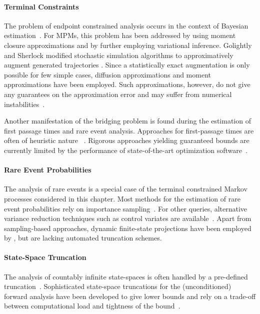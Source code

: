 \paragraph{Terminal Constraints}
The problem of endpoint constrain\-ed analysis occurs in the context
of Bayesian estimation~\parencite{sarkka2013bayesian}.
For \acp{MPM}, this problem has been addressed by
\citet{huang2016reconstructing} using moment closure approximations
and by \citet{wildner2019moment} further employing variational inference.
Golightly and Sherlock modified stochastic simulation algorithms to
approximatively
augment generated trajectories  \parencite{golightly2019efficient}.
Since a statistically exact augmentation is only possible for few
simple cases, diffusion approximations
\parencite{golightly2005bayesian} and moment approximations
\parencite{milner2013moment} have been employed.
Such approximations, however, do not give any guarantees on the
approximation error
and may suffer from numerical instabilities~\parencite{schnoerr2014validity}.

Another manifestation of the bridging problem is found during the
estimation of first passage times and rare event analysis.
Approaches for first-passage times are often of heuristic nature
~\parencite{schnoerr2017efficient,hayden2012fluid,bortolussi2014stochastic}.
Rigorous approaches yielding guaranteed bounds are currently limited
by the performance of state-of-the-art optimization
software~\parencite{backenkohler2019bounding}.

\paragraph{Rare Event Probabilities}
The analysis of rare events is a special case of the terminal
constrained Markov processes considered in this chapter.
Most methods for the estimation of rare event probabilities  rely on
importance sampling~\parencite{kuwahara2008efficient,daigle2011automated}.
For other queries, alternative variance reduction techniques such as
control variates are available~\parencite{backenkohler2019control}.
Apart from sampling-based approaches, dynamic finite-state
projections have been employed by \citet{mikeev2013numerical}, but
are lacking automated truncation schemes.

\paragraph{State-Space Truncation}
The analysis of countably infinite state-spaces is often handled by a
pre-defined truncation~\parencite{kwiatkowska2011prism}.
Sophisticated state-space truncations for the (unconditioned) forward
analysis have been developed to give lower bounds and rely on a
trade-off between computational load and tightness of the
bound~\parencite{munsky2006finite,lapin2011shave,andreychenko2011parameter,henzinger2009sliding,mikeev2013fly}.

